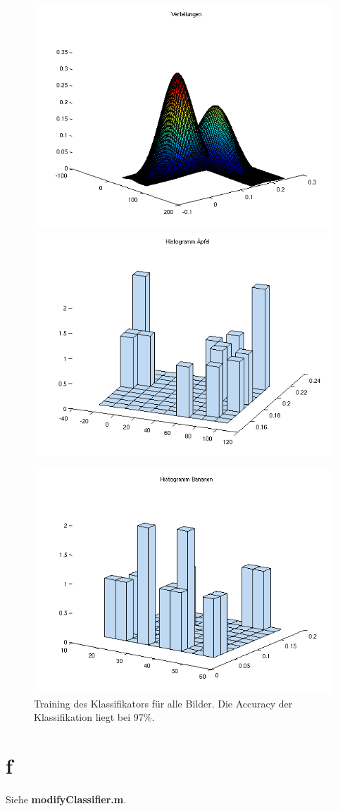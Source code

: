 \documentclass[a4paper,10pt]{article}
\begin{document}
\begin{figure}[htbp]
  \centering
    \includegraphics[width=1\linewidth]{plot8.png}
    \includegraphics[width=1\linewidth]{plot9.png}
\end{figure}
\begin{figure}[htbp]
  \centering
    \includegraphics[width=1\linewidth]{plot10.png}
  \caption{Training des Klassifikators für alle Bilder. Die Accuracy der Klassifikation liegt bei 97\%.}
\end{figure}

\section{f}

Siehe \textbf{modifyClassifier.m}. 
\end{document}

